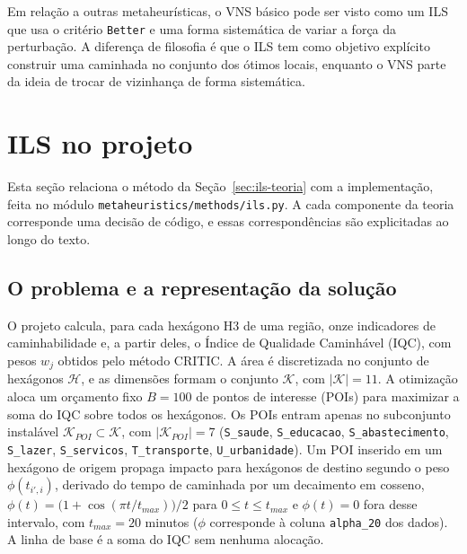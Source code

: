 \documentclass[11pt,a4paper]{article}
\newcommand{\code}[1]{\texttt{#1}}
\begin{document}
Em relação a outras metaheurísticas, o VNS básico pode ser visto como um ILS que usa o critério \code{Better} e uma forma sistemática de variar a força da perturbação. A diferença de filosofia é que o ILS tem como objetivo explícito construir uma caminhada no conjunto dos ótimos locais, enquanto o VNS parte da ideia de trocar de vizinhança de forma sistemática.

\section{ILS no projeto}
\label{sec:ils-projeto}

Esta seção relaciona o método da Seção~\ref{sec:ils-teoria} com a implementação, feita no módulo \code{metaheuristics/methods/ils.py}. A cada componente da teoria corresponde uma decisão de código, e essas correspondências são explicitadas ao longo do texto.

\subsection{O problema e a representação da solução}

O projeto calcula, para cada hexágono H3 de uma região, onze indicadores de caminhabilidade e, a partir deles, o Índice de Qualidade Caminhável (IQC), com pesos $w_j$ obtidos pelo método CRITIC. A área é discretizada no conjunto de hexágonos $\mathcal{H}$, e as dimensões formam o conjunto $\mathcal{K}$, com $|\mathcal{K}| = 11$. A otimização aloca um orçamento fixo $B = 100$ de pontos de interesse (POIs) para maximizar a soma do IQC sobre todos os hexágonos. Os POIs entram apenas no subconjunto instalável $\mathcal{K}_{POI} \subset \mathcal{K}$, com $|\mathcal{K}_{POI}| = 7$ (\code{S\_saude}, \code{S\_educacao}, \code{S\_abastecimento}, \code{S\_lazer}, \code{S\_servicos}, \code{T\_transporte}, \code{U\_urbanidade}). Um POI inserido em um hexágono de origem propaga impacto para hexágonos de destino segundo o peso $\phi(t_{i',i})$, derivado do tempo de caminhada por um decaimento em cosseno, $\phi(t) = \bigl(1 + \cos(\pi t / t_{max})\bigr)/2$ para $0 \le t \le t_{max}$ e $\phi(t) = 0$ fora desse intervalo, com $t_{max} = 20$ minutos ($\phi$ corresponde à coluna \code{alpha\_20} dos dados). A linha de base é a soma do IQC sem nenhuma alocação.
\end{document}
